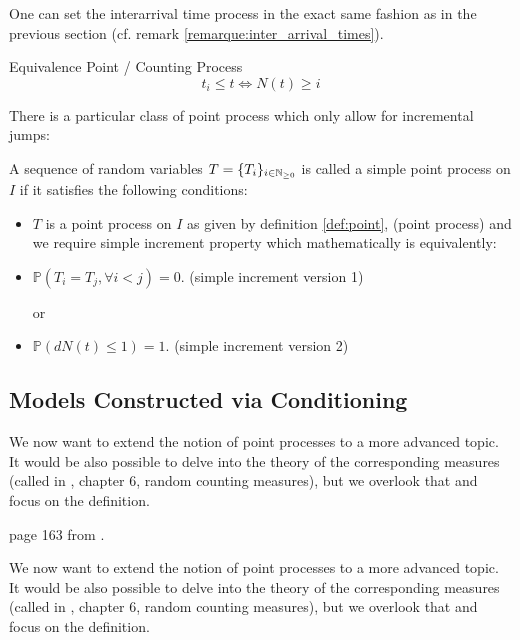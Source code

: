 \documentclass[11pt]{book}
\newcommand{\sequence}[1]{\{ #1 \}_{ i \in \N} }
\begin{document}
\begin{remarque}
One can set the interarrival time process in the exact same fashion as in the previous section (cf. remark \ref{remarque:inter_arrival_times}).
\end{remarque}

\begin{theoreme}[label = thrm:point_counting]{Equivalence Point / Counting Process}
\begin{equation}
t_i \leq t  \iff N(t) \geq i 
\end{equation}
\end{theoreme}


There is a particular class of point process which only allow for incremental jumps:
\begin{definition}
A sequence of random variables $T = \sequence{T_i}$ is called a simple point process on $I$ if it satisfies the following conditions:
\begin{itemize}
\setlength{\itemindent}{3 cm}
\item $T$ is a point process on $I$ as given by definition \ref{def:point}, (point process)
and we require simple increment property which mathematically is equivalently:
\item $\mathbb P ( T_i = T_j, \forall i < j) = 0$. (simple increment version 1)

or

\item $\mathbb P ( dN(t) \leq 1) = 1$. (simple increment version 2)
\end{itemize}
\end{definition}


\subsection{Models Constructed via Conditioning}
We now want to extend the notion of point processes to a more advanced topic. It would be also possible to delve into the theory of the corresponding measures (called in \cite{daley}, chapter 6, random counting measures), but we overlook that and focus on the definition.


\begin{ajoutationV}{}{}
page 163 from \cite{daley}.


We now want to extend the notion of point processes to a more advanced topic. It would be also possible to delve into the theory of the corresponding measures (called in \cite{daley}, chapter 6, random counting measures), but we overlook that and focus on the definition.

\end{ajoutationV}
\end{document}
